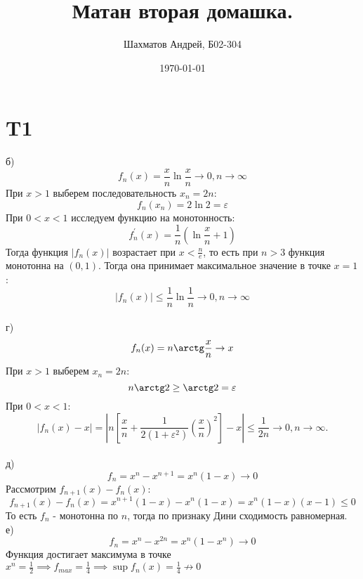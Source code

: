 \documentclass[12pt]{article}
\title{Матан вторая домашка.}
\author{Шахматов Андрей, Б02-304}
\date{\today}
\begin{document}
\maketitle
\tableofcontents

\section{T1}
б)
\[
    f_n(x) = \frac{x}{n} \ln \frac{x}{n} \to 0, n \to \infty
\]
При $x > 1$ выберем последовательность $x_n = 2n$:
\[
    f_n(x_n) = 2 \ln 2 = \varepsilon
\]
При $0 < x < 1$ исследуем функцию на монотонность:
\[
    f_n^{\prime}(x) = \frac{1}{n} \left( \ln \frac{x}{n} + 1 \right)
\]
Тогда функция $\vert f_n(x) \vert $ возрастает при $x < \frac{n}{e}$, то есть при $n > 3$ функция
монотонна на $(0, 1)$. Тогда она принимает максимальное значение в точке $x = 1$:
\[
    \vert f_n(x) \vert \leq \frac{1}{n} \ln \frac{1}{n} \to 0, n \to \infty
\]
\\г)
\[
    f_n(x) = n \arctg \frac{x}{n} \to x
\]
При $x > 1$ выберем $x_n = 2n$:
\[
    n \arctg 2 \geq \arctg 2 = \varepsilon
\]
При $0 < x < 1$:
\[
    \left\vert f_n(x) - x \right\vert  = \left\vert n \left[ \frac{x}{n} + \frac{1}{2(1 + \varepsilon^2)} \left( \frac{x}{n} \right)^2 \right]   - x \right\vert  \leq \frac{1}{2n} \to 0, n \to \infty.
\]
\\д)
\[
    f_n = x^n - x^{n+1} = x^n(1 - x) \to 0
\]
Рассмотрим $f_{n+1}(x) - f_n(x)$:
\[
    f_{n+1}(x) - f_n(x) = x^{n+1}(1 - x) - x^n(1 - x) = x^n(1 - x)(x - 1) \leq 0
\]
То есть $f_n$ - монотонна по $n$, тогда по признаку Дини сходимость равномерная.
\\е)
\[
    f_n = x^n - x^{2n} = x^n(1 - x^n) \to 0
\]
Функция достигает максимума в точке $x^n = \frac{1}{2} \implies f_{max} = \frac{1}{4} \implies \sup f_n(x) = \frac{1}{4} \not \to 0$
\end{document}
